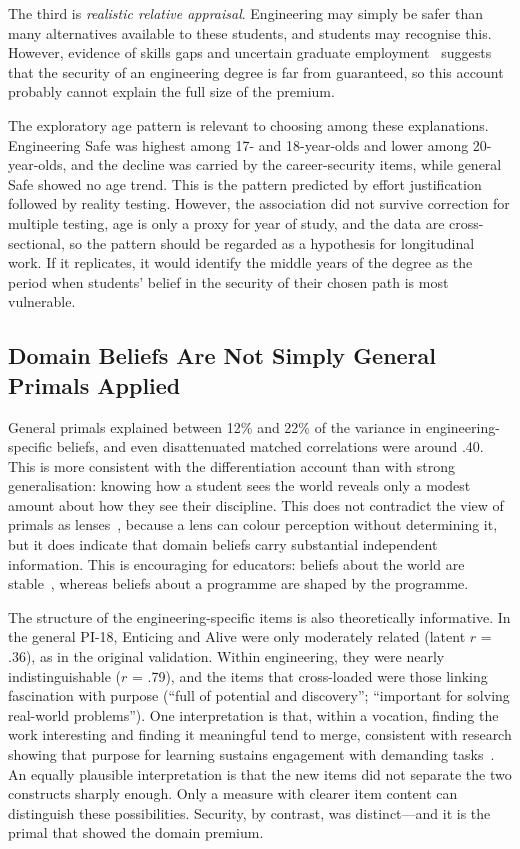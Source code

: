 \documentclass[journal,a4paper]{IEEEtran}
\begin{document}
The third is \emph{realistic relative appraisal}. Engineering may simply be safer than many alternatives available to these students, and students may recognise this. However, evidence of skills gaps and uncertain graduate employment~\cite{blom2011,loyalka2021} suggests that the security of an engineering degree is far from guaranteed, so this account probably cannot explain the full size of the premium.

The exploratory age pattern is relevant to choosing among these explanations. Engineering Safe was highest among 17- and 18-year-olds and lower among 20-year-olds, and the decline was carried by the career-security items, while general Safe showed no age trend. This is the pattern predicted by effort justification followed by reality testing. However, the association did not survive correction for multiple testing, age is only a proxy for year of study, and the data are cross-sectional, so the pattern should be regarded as a hypothesis for longitudinal work. If it replicates, it would identify the middle years of the degree as the period when students' belief in the security of their chosen path is most vulnerable.

\subsection{Domain Beliefs Are Not Simply General Primals Applied}

General primals explained between 12\% and 22\% of the variance in engineering-specific beliefs, and even disattenuated matched correlations were around .40. This is more consistent with the differentiation account than with strong generalisation: knowing how a student sees the world reveals only a modest amount about how they see their discipline. This does not contradict the view of primals as lenses~\cite{clifton2019}, because a lens can colour perception without determining it, but it does indicate that domain beliefs carry substantial independent information. This is encouraging for educators: beliefs about the world are stable~\cite{ludwig2023}, whereas beliefs about a programme are shaped by the programme.

The structure of the engineering-specific items is also theoretically informative. In the general PI-18, Enticing and Alive were only moderately related (latent $r$ = .36), as in the original validation. Within engineering, they were nearly indistinguishable ($r$ = .79), and the items that cross-loaded were those linking fascination with purpose (``full of potential and discovery''; ``important for solving real-world problems''). One interpretation is that, within a vocation, finding the work interesting and finding it meaningful tend to merge, consistent with research showing that purpose for learning sustains engagement with demanding tasks~\cite{yeager2014}. An equally plausible interpretation is that the new items did not separate the two constructs sharply enough. Only a measure with clearer item content can distinguish these possibilities. Security, by contrast, was distinct—and it is the primal that showed the domain premium.
\end{document}
